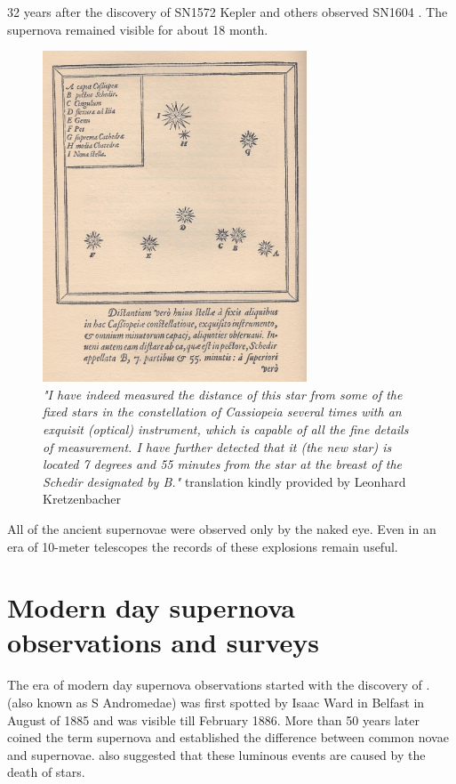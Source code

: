 32 years after the discovery of SN1572 Kepler and others observed SN1604 \citet{kepler1606} . The supernova remained visible for about 18 month. 

\begin{figure}[htbp] %
   \centering
   \includegraphics[width=0.7\textwidth]{chapter_intro/plots/Tycho_Cas_SN1572.jpg} 
   \caption{\textit{"I have indeed measured the distance of this star from some of the fixed stars in the constellation of Cassiopeia several times with an
exquisit (optical) instrument, which is capable of all the fine details of measurement. I have further detected that it
(the new star) is located 7 degrees and 55 minutes from the star at the breast of the Schedir designated by B."} translation kindly provided by Leonhard Kretzenbacher}
   \label{fig:sn1572_tycho_chart}
\end{figure}

All of the ancient supernovae were observed only by the naked eye. Even in an era of 10-meter telescopes the records of these explosions remain useful.

\section{Modern day supernova observations and surveys}
\label{sec:surveys}

The era of modern day supernova observations started with the discovery of .  (also known as S Andromedae) was first spotted by Isaac Ward in Belfast in August of 1885 \citep{1885AN....112..360H} and was visible till February 1886. 
More than 50 years later \citet{1934PNAS...20..254B} coined the term supernova and established the difference between common novae and supernovae. \citet{1934PNAS...20..254B} also suggested that these luminous events are caused by the death of stars. 

